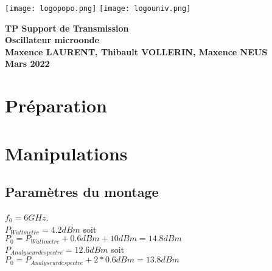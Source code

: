 \documentclass[oneside,a4paper,12pt]{article}
\begin{document}
	\begin{titlepage}
		\texttt{[image: logopopo.png]}
		\hspace*{\fill}
		\texttt{[image: logouniv.png]}
		
		\begin{center}
			\vspace{1cm}
			\textbf{TP Support de Transmission}\\
			\textbf{Oscillateur microonde}\\
			\vspace{1cm}
			\textbf{Maxence LAURENT, Thibault VOLLERIN, Maxence NEUS}\\
			\vspace{3cm}
			\vspace{\fill}
			\textbf{Mars 2022}\\
		\end{center}
	\end{titlepage}
	
	\tableofcontents
	
	\vspace{5cm}
	
	\begin{abstract}
	
	\end{abstract}

	\newpage

	\section{Préparation}
	
	

	\newpage

	\section{Manipulations}

	\subsection*{Paramètres du montage}
	$ f_{0} = 6 GHz $.\\


	$ P_{Wattmetre} = 4.2 dBm $ soit\\
	$ P_{0} = P_{Wattmetre} + 0.6 dBm + 10 dBm = 14.8 dBm $ \\


	$ P_{Analyseur de spectre} = 12.6 dBm $ soit \\
	$ P_{0} = P_{Analyseur de spectre} + 2* 0.6 dBm = 13.8 dBm $\\
\end{document}
